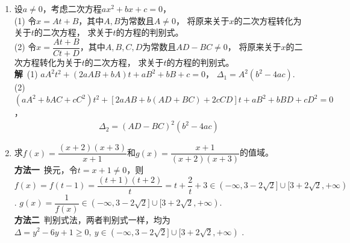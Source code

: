 \begin{enumerate}[label={【\textbf{例\thechapter.\arabic*}】},
 leftmargin=\inteval{\myenumleftmargin}pt,
 itemsep=\inteval{\myenumitempsep}pt,
 itemindent=\inteval{\myenumitemindent}pt]
\item \label{二次方程线性变换} 设$a\neq 0$，考虑二次方程$ax^2+bx+c=0$，\\
(1) 令$x=At+B$，其中$A,B$为常数且$A\neq0$，
将原来关于$x$的二次方程转化为关于$t$的二次方程，
求关于$ t $的方程的判别式。\\
(2) 令$x=\dfrac{At+B}{Ct+D}$，其中$A,B,C,D$为常数且$AD-BC\neq0$，
将原来关于$x$的二次方程转化为关于$t$的二次方程，
求关于$ t $的方程的判别式。\\
\textbf{解}\ (1) $aA^2t^2+(2aAB+bA)t+aB^2+bB+c=0$，
$\Delta_1=A^2(b^2-4ac)$. \\
(2) $ (aA^2+bAC+cC^2)t^2+[2aAB+b(AD+BC)+2cCD]t+aB^2+bBD+cD^2=0 $，
\begin{gather}\label{二次方程分式线性变换}
    \Delta_2=(AD-BC)^2(b^2-4ac)
\end{gather} 

\item 求$ f(x)=\dfrac{(x+2)(x+3)}{x+1} $和$ g(x)=\dfrac{x+1}{(x+2)(x+3)} $的值域。\\
\textbf{方法一}\ 换元，令$ t=x+1\neq 0 $，则$ f(x)=f(t-1)=\dfrac{(t+1)(t+2)}{t}=t+
\dfrac{2}{t}+3\in (-\infty,3-2\sqrt{2}]\cup [3+2\sqrt{2},+\infty) $. 
$ g(x)=\dfrac{1}{f(x)}\in (-\infty,3-2\sqrt{2}]\cup [3+2\sqrt{2},+\infty) $. \\
\textbf{方法二}\ 判别式法，两者判别式一样，均为$ \Delta=y^2-6y+1\geq 0,\ y
\in (-\infty,3-2\sqrt{2}]\cup [3+2\sqrt{2},+\infty) $ .


\end{enumerate}

